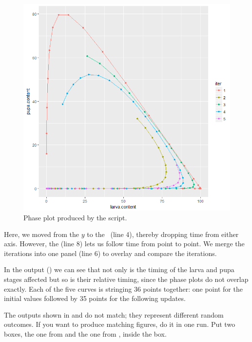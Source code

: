 \begin{figure}
\centering
\includegraphics[scale=0.5]{graphics/sensitivity2}
\caption{Phase plot produced by the   script.}
\label{fig:sensitivity2}
\end{figure}

Here, we moved  from the $y$ to the \xaxis\ (line 4), thereby dropping time from either axis. However, the  (line 8) lets us follow time from point to point. We merge the iterations into one panel (line 6) to overlay and compare the iterations.

In the output () we can see that not  only is the timing of the larva and pupa stages affected but so is their relative timing, since the phase plots do not overlap exactly. Each of the five curves is stringing 36 points together: one point for the initial values followed by 35 points for the following updates. 

The outputs shown in  and  do not match; they represent different random outcomes. If you want to produce matching figures, do it in one run. Put two  boxes, the one from  and the one from , inside the  box.

